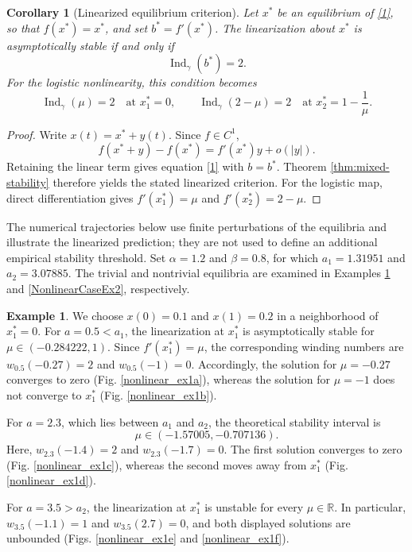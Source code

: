 \documentclass[11pt,a4paper]{article}
\newtheorem{cor}[thm]{Corollary}
\theoremstyle{definition}
\newtheorem{ex}[thm]{Example}
\begin{document}
\begin{cor}[Linearized equilibrium criterion]\label{cor:nonlinear}
Let $x^*$ be an equilibrium of \eqref{1}, so that $f(x^*)=x^*$, and set $b^*=f'(x^*)$. The linearization about $x^*$ is asymptotically stable if and only if
\begin{equation*}
\operatorname{Ind}_{\gamma}(b^*)=2.
\end{equation*}
For the logistic nonlinearity, this condition becomes
\begin{equation*}
\operatorname{Ind}_{\gamma}(\mu)=2
\quad\text{at }x_1^*=0,
\qquad
\operatorname{Ind}_{\gamma}(2-\mu)=2
\quad\text{at }x_2^*=1-\frac{1}{\mu}.
\end{equation*}
\end{cor}

\begin{proof}
Write $x(t)=x^*+y(t)$. Since $f\in C^1$,
\begin{equation*}
f(x^*+y)-f(x^*)=f'(x^*)y+o(|y|).
\end{equation*}
Retaining the linear term gives equation \eqref{1} with $b=b^*$. Theorem \ref{thm:mixed-stability} therefore yields the stated linearized criterion. For the logistic map, direct differentiation gives $f'(x_1^*)=\mu$ and $f'(x_2^*)=2-\mu$.
\end{proof}

The numerical trajectories below use finite perturbations of the equilibria and illustrate the linearized prediction; they are not used to define an additional empirical stability threshold. Set $\alpha = 1.2$ and $\beta = 0.8$, for which $a_1 = 1.31951$ and $a_2 = 3.07885$. The trivial and nontrivial equilibria are examined in Examples \ref{NonlinearCaseEx1} and \ref{NonlinearCaseEx2}, respectively.

\begin{ex}	 
 We choose $x(0) = 0.1$ and $x(1) = 0.2$ in a neighborhood of $x_1^* = 0$. For $a = 0.5 < a_1$, the linearization at $x_1^*$ is asymptotically stable for $\mu \in (-0.284222,1)$. Since $f'(x_1^*)=\mu$, the corresponding winding numbers are $w_{0.5}(-0.27)=2$ and $w_{0.5}(-1)=0$. Accordingly, the solution for $\mu = -0.27$ converges to zero (Fig. \ref{nonlinear_ex1a}), whereas the solution for $\mu = -1$ does not converge to $x_1^*$ (Fig. \ref{nonlinear_ex1b}).
 
 \par For $a = 2.3$, which lies between $a_1$ and $a_2$, the theoretical stability interval is
 \[
 \mu \in (-1.57005,-0.707136).
 \]
 Here, $w_{2.3}(-1.4)=2$ and $w_{2.3}(-1.7)=0$. The first solution converges to zero (Fig. \ref{nonlinear_ex1c}), whereas the second moves away from $x_1^*$ (Fig. \ref{nonlinear_ex1d}).
 \par For $a = 3.5 > a_2$, the linearization at $x_1^*$ is unstable for every $\mu \in \mathbb{R}$. In particular, $w_{3.5}(-1.1)=1$ and $w_{3.5}(2.7)=0$, and both displayed solutions are unbounded (Figs. \ref{nonlinear_ex1e} and \ref{nonlinear_ex1f}).\label{NonlinearCaseEx1}
 \end{ex}
\end{document}

